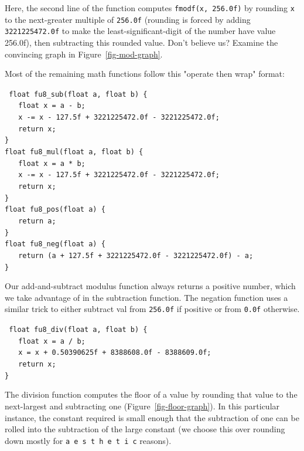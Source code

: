 \documentclass{acmsiggraph}
\theoremstyle{remark}
\theoremstyle{definition}
\begin{document}
Here, the second line of the function computes {\tt fmodf(x, 256.0f)} by rounding {\tt x} to the next-greater multiple of {\tt 256.0f} (rounding is forced by adding {\tt 3221225472.0f} to make the least-significant-digit of the number have value 256.0f), then subtracting this rounded value.
Don't believe us? Examine the convincing graph in Figure~\ref{fig-mod-graph}.

Most of the remaining math functions follow this "operate then wrap" format:

{\tt
float fu8\_sub(float a, float b) \{ \\
$\phantom{XX}$float x = a - b; \\
$\phantom{XX}$x -= x - 127.5f + 3221225472.0f - 3221225472.0f; \\
$\phantom{XX}$return x; \\
\} \\
float fu8\_mul(float a, float b) \{ \\
$\phantom{XX}$float x = a * b; \\
$\phantom{XX}$x -= x - 127.5f + 3221225472.0f - 3221225472.0f; \\
$\phantom{XX}$return x; \\
\} \\
float fu8\_pos(float a) \{ \\
$\phantom{XX}$return a; \\
\} \\
float fu8\_neg(float a) \{ \\
$\phantom{XX}$return (a + 127.5f + 3221225472.0f - 3221225472.0f) - a;\\
\} \\
}

Our add-and-subtract modulus function always returns a positive number, which we take advantage of in the subtraction function.
The negation function uses a similar trick to either subtract val from {\tt 256.0f} if positive or from {\tt 0.0f} otherwise.


{\tt
float fu8\_div(float a, float b) \{ \\
$\phantom{XX}$float x = a / b; \\
$\phantom{XX}$x = x + 0.50390625f + 8388608.0f - 8388609.0f; \\
$\phantom{XX}$return x; \\
\}
}

The division function computes the floor of a value by rounding that value to the next-largest and subtracting one (Figure~\ref{fig-floor-graph}).
In this particular instance, the constant required is small enough that the subtraction of one can be rolled into the subtraction of the large constant (we choose this over rounding down mostly for {\tt a e s t h e t i c} reasons).
\end{document}
